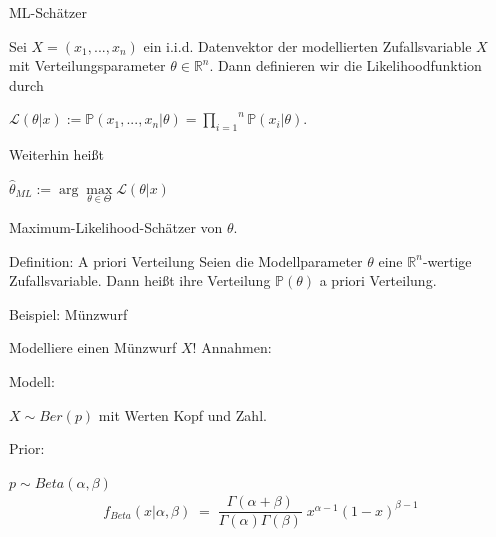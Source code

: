 \documentclass{beamer}
\begin{document}
{%

\begin{frame}{ML-Schätzer}

Sei $X=(x_1,...,x_n)$ ein i.i.d. Datenvektor der modellierten Zufallsvariable $X$ mit Verteilungsparameter $\theta\in\mathbb{R}^n$. Dann definieren wir die Likelihoodfunktion durch

\begin{center}
$\mathcal{L}( \theta \vert x):= \mathbb{P}(x_1,...,x_n\vert \theta) =\overset{n}{\underset{i=1}{\prod}}\mathbb{P}(x_i\vert \theta).$
\end{center}
 Weiterhin heißt
\begin{center}
$\hat{\theta}_{ML} := \arg\underset{\theta \in \Theta}{\max} \mathcal{L}( \theta \vert x)$
\end{center}

Maximum-Likelihood-Schätzer von $\theta$.

\end{frame}



\begin{frame}
\begin{block}{Definition: A priori Verteilung}
Seien die Modellparameter $\theta$ eine $\mathbb{R}^n$-wertige Zufallsvariable. Dann heißt ihre Verteilung $\mathbb{P}(\theta)$ a priori Verteilung.

\end{block}


\end{frame}


\begin{frame}{Beispiel: Münzwurf}

	\begin{minipage}{7cm}
		Modelliere einen Münzwurf $X$! Annahmen:
		
		Modell:
		
		$X \sim Ber(p)$ mit Werten Kopf und Zahl.
		
		Prior:
		
		$p \sim Beta(\alpha,\beta)$\\
		\begin{align}
			f_{Beta}\left(x\vert\alpha,\beta\right)\;=\;\dfrac{\varGamma(\alpha+\beta)}{\varGamma(\alpha)\varGamma(\beta)}\;x^{\alpha-1}(1-x)^{\beta-1}
		\end{align}
	\end{minipage}
	\begin{minipage}{3cm}
		\flushright
		\pause
\end{minipage}
\end{frame}}
\end{document}
